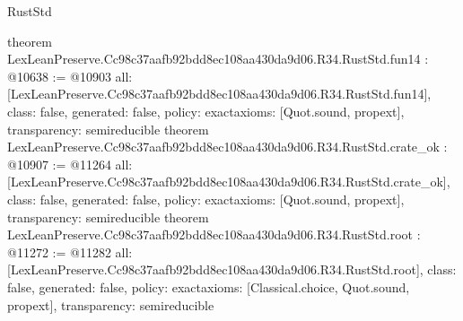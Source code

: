 \begin{lexlean}{RustStd}
\begin{coremodule}
{}
theorem LexLeanPreserve.Cc98c37aafb92bdd8ec108aa430da9d06.R34.RustStd.fun14 : @10638 := @10903 {
  all: [LexLeanPreserve.Cc98c37aafb92bdd8ec108aa430da9d06.R34.RustStd.fun14],
  class: false,
  generated: false,
  policy: exact{axioms: [Quot.sound, propext]},
  transparency: semireducible
}
theorem LexLeanPreserve.Cc98c37aafb92bdd8ec108aa430da9d06.R34.RustStd.crate_ok : @10907 := @11264 {
  all: [LexLeanPreserve.Cc98c37aafb92bdd8ec108aa430da9d06.R34.RustStd.crate_ok],
  class: false,
  generated: false,
  policy: exact{axioms: [Quot.sound, propext]},
  transparency: semireducible
}
theorem LexLeanPreserve.Cc98c37aafb92bdd8ec108aa430da9d06.R34.RustStd.root : @11272 := @11282 {
  all: [LexLeanPreserve.Cc98c37aafb92bdd8ec108aa430da9d06.R34.RustStd.root],
  class: false,
  generated: false,
  policy: exact{axioms: [Classical.choice, Quot.sound, propext]},
  transparency: semireducible
}


\end{coremodule}
\end{lexlean}
